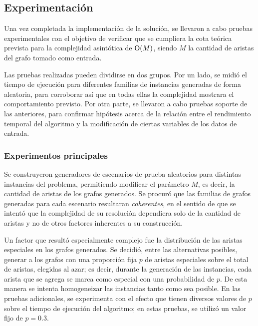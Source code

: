     \subsection{Experimentación}

    Una vez completada la implementación de la solución, se llevaron a cabo
    pruebas experimentales con el objetivo de verificar que se cumpliera la
    cota teórica prevista para la complejidad asintótica de $\operatorname{O}(M)$, siendo
    $M$ la cantidad de aristas del grafo tomado como entrada.

    Las pruebas realizadas pueden dividirse en dos grupos. Por un lado, se
    midió el tiempo de ejecución para diferentes familias de instancias
    generadas de forma aleatoria, para corroborar así que en todas ellas la
    complejidad mostrara el comportamiento previsto. Por otra parte, se
    llevaron a cabo pruebas soporte de las anteriores, para confirmar
    hipótesis acerca de la relación entre el rendimiento temporal del
    algoritmo y la modificación de ciertas variables de los datos de entrada.

    \subsubsection{Experimentos principales}

    \newcommand\constante{300}

    Se construyeron generadores de escenarios de prueba aleatorios para distintas
    instancias del problema, permitiendo modificar el parámetro $M$, es decir,
    la cantidad de aristas de los grafos generados. Se procuró que las familias
    de grafos generadas para cada escenario resultaran \emph{coherentes}, en
    el sentido de que se intentó que la complejidad de su resolución dependiera
    solo de la cantidad de aristas y no de otros factores inherentes a su
    construcción.

    Un factor que resultó especialmente complejo fue la distribución de las
    aristas especiales en los grafos generados. Se decidió, entre las alternativas
    posibles, generar a los grafos con una proporción fija $p$ de aristas
    especiales sobre el total de aristas, elegidas al azar; es decir, durante
    la generación de las instancias, cada arista que se agrega se marca como
    especial con una probabilidad de $p$. De esta manera se intenta
    homogeneizar las instancias tanto como sea posible. En las pruebas
    adicionales, se experimenta con el efecto que tienen diversos valores de
    $p$ sobre el tiempo de ejecución del algoritmo; en estas pruebas, se
    utilizó un valor fijo de $p = 0.3$.

